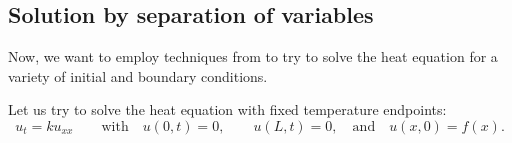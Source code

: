 \subsection{Solution by separation of variables}

Now, we want to employ techniques from  to try to solve the heat equation for a variety of initial and boundary conditions. 

\begin{example} 
Let us try to solve the heat equation with fixed temperature endpoints:
\begin{equation*}
u_t = k u_{xx}
\qquad \text{with} \quad
u(0,t) = 0 ,\quad \quad u(L,t) = 0,
\quad \text{and} \quad u(x,0) = f(x) .
\end{equation*}
\end{example}

